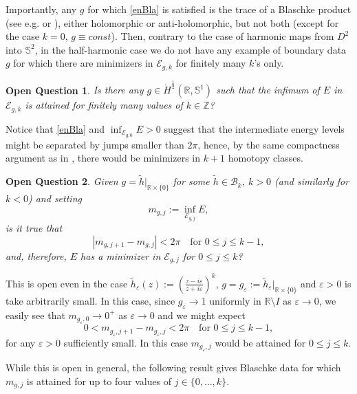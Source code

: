 \documentclass[12pt, a4paper]{article}
\newtheorem{pb}{Open Question}
\newcommand{\sph}{\mathbb{S}}
\newcommand{\R}{\mathbb{R}}
\newcommand{\ve}{\varepsilon}
\renewcommand{\(}{\left(}
\renewcommand{\)}{\right)}
\begin{document}
Importantly, any $g$ for which \eqref{enBla} is satisfied is the trace of a Blaschke product (see e.g. \cite[Lemma 3.1]{BMRS} or \cite[Lemma 5.1]{HM}), either holomorphic or anti-holomorphic, but not both (except for the case $k=0$, $g\equiv const$). Then, contrary to the case of harmonic maps from $D^2$ into $\sph^2$, in the half-harmonic case we do not have any example of boundary data $g$ for which there are minimizers in $\mathcal{E}_{g,k}$ for finitely many $k$'s only.

\begin{pb} Is there any $g\in \dot H^\frac12(\R,\sph^1)$ such that the infimum of $E$ in $\mathcal{E}_{g,k}$ 
is attained for finitely many values of $k\in \mathbb{Z}$?
\end{pb}

Notice that \eqref{enBla} and $\inf_{\mathcal{E}_{g,0}} E>0$ suggest that the intermediate energy levels might be separated by jumps smaller than $2\pi$, hence, by the same compactness argument as in \cite{HM}, there would be minimizers in $k+1$ homotopy classes.


\begin{pb} Given $g=\tilde h|_{\R\times\{0\}}$ for some $\tilde h\in \mathcal{B}_k$, $k> 0$ (and similarly for $k<0$) and setting
$$m_{g,j}:= \inf_{\mathcal{E}_{g,j}} E,$$
is it true that
\begin{equation}\label{mj}
|m_{g,j+1}-m_{g,j}|<2\pi\quad \text{for }0\le j\le k-1,
\end{equation}
and, therefore, $E$ has a minimizer in $\mathcal{E}_{g,j}$ for $0\le j\le k$?
\end{pb}

This is open even in the case $\tilde h_\ve(z):=\left(\frac{z-i\ve}{z+i\ve}\right)^k$, $g=g_\ve:=\tilde h_\ve |_{\R\times\{0\}}$ and $\ve>0$ is take arbitrarily small. In this case, since $g_\ve\to 1$ uniformly in $\R\setminus I$ as $\ve\to 0$, we easily see that $m_{g_\ve,0}\to 0^+$ as $\ve\to 0$ and we might expect
$$0<m_{g_\ve,j+1}-m_{g_\ve,j}<2\pi\quad \text{for }0\le j\le k-1,$$
for any $\ve>0$ sufficiently small. In this case $m_{g_\ve,j}$ would be attained for $0\le j\le k$.

While this is open in general, the following result gives Blaschke data for which $m_{g,j}$ is attained for up to four values of $j\in \{0,\dots,k\}$.
\end{document}
